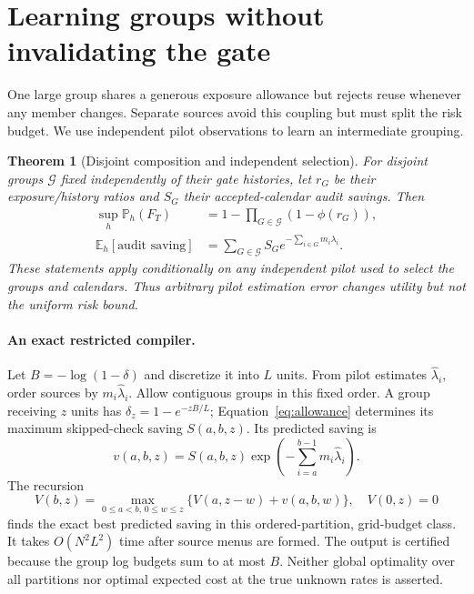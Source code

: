 \documentclass{article}
\newtheorem{theorem}{Theorem}
\newcommand{\Pp}{\mathbb P}
\newcommand{\Ee}{\mathbb E}
\newcommand{\1}{\mathbf 1}
\begin{document}
\section{Learning groups without invalidating the gate}\label{sec:groups}
One large group shares a generous exposure allowance but rejects reuse whenever any member changes. Separate sources avoid this coupling but must split the risk budget. We use independent pilot observations to learn an intermediate grouping.

\begin{theorem}[Disjoint composition and independent selection]\label{thm:compose}
For disjoint groups $\mathcal G$ fixed independently of their gate histories, let $r_G$ be their exposure/history ratios and $S_G$ their accepted-calendar audit savings. Then
\begin{align}
 \sup_h\Pp_h(F_T)&=1-\prod_{G\in\mathcal G}(1-\phi(r_G)),\label{eq:product}\\
 \Ee_h[\text{audit saving}]&=\sum_{G\in\mathcal G}S_G e^{-\sum_{i\in G}m_i\lambda_i}.\label{eq:utility}
\end{align}
These statements apply conditionally on any independent pilot used to select the groups and calendars. Thus arbitrary pilot estimation error changes utility but not the uniform risk bound.
\end{theorem}

\paragraph{An exact restricted compiler.}
Let $B=-\log(1-\delta)$ and discretize it into $L$ units. From pilot estimates $\widehat\lambda_i$, order sources by $m_i\widehat\lambda_i$. Allow contiguous groups in this fixed order. A group receiving $z$ units has $\delta_z=1-e^{-zB/L}$; Equation~\eqref{eq:allowance} determines its maximum skipped-check saving $S(a,b,z)$. Its predicted saving is
\begin{equation}
 v(a,b,z)=S(a,b,z)\exp\!\left(-\sum_{i=a}^{b-1}m_i\widehat\lambda_i\right).
\end{equation}
The recursion
\begin{equation}
 V(b,z)=\max_{0\leq a<b,\,0\leq w\leq z}\{V(a,z-w)+v(a,b,w)\},
 \quad V(0,z)=0\label{eq:dp}
\end{equation}
finds the exact best predicted saving in this ordered-partition, grid-budget class. It takes $O(N^2L^2)$ time after source menus are formed. The output is certified because the group log budgets sum to at most $B$. Neither global optimality over all partitions nor optimal expected cost at the true unknown rates is asserted.
\end{document}
